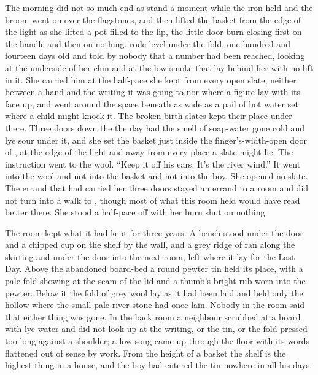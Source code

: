 The morning did not so much end as stand a moment while the iron held and the broom went on over the flagstones, and then  lifted the basket from the edge of the light as she lifted a pot filled to the lip, the little-door burn closing first on the handle and then on nothing.  rode level under the fold, one hundred and fourteen days old and told by nobody that a number had been reached, looking at the underside of her chin and at the low smoke that lay behind her with no lift in it. She carried him at the half-pace she kept from every open slate, neither between a hand and the writing it was going to nor where a figure lay with its face up, and went around the space beneath  as wide as a pail of hot water set where a child might knock it. The broken birth-slates kept their place under there. Three doors down the  the day had the smell of soap-water gone cold and lye sour under it, and she set the basket just inside the finger's-width-open door of , at the edge of the light and away from every place a slate might lie. The instruction went to the wool. “Keep it off his ears. It's the river wind.” It went into the wool and not into the basket and not into the boy. She opened no slate. The errand that had carried her three doors stayed an errand to a room and did not turn into a walk to , though most of what this room held would have read better there. She stood a half-pace off with her burn shut on nothing.

The room kept what it had kept for three years. A bench stood under the door and a chipped cup on the shelf by the wall, and a grey ridge of  ran along the skirting and under the door into the next room, left where it lay for the Last Day. Above the abandoned board-bed a round pewter tin held its place, with a pale fold showing at the seam of the lid and a thumb's bright rub worn into the pewter. Below it the fold of grey wool lay as it had been laid and held only the hollow where the small pale river stone had once lain. Nobody in the room said that either thing was gone. In the back room a neighbour scrubbed at a board with lye water and did not look up at the writing, or the tin, or the fold pressed too long against a shoulder; a low song came up through the floor with its words flattened out of sense by work. From the height of a basket the shelf is the highest thing in a house, and the boy had entered the tin nowhere in all his days.

